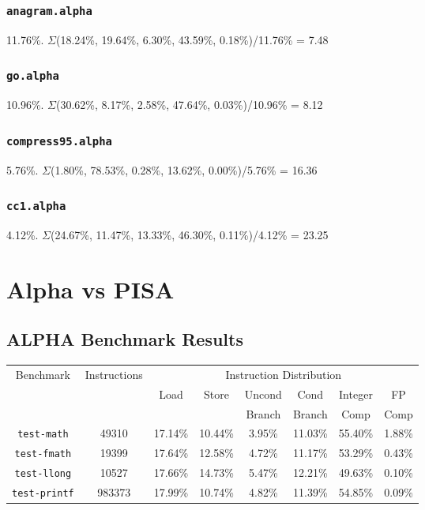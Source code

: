 \documentclass[11pt]{article}
\begin{document}
\subsubsection{\texttt{anagram.alpha}}
\label{sec:org025cec7}
11.76\%. \(\Sigma\)(18.24\%, 19.64\%, 6.30\%, 43.59\%, 0.18\%)/11.76\% = 7.48
\subsubsection{\texttt{go.alpha}}
\label{sec:org6ae7f30}
10.96\%. \(\Sigma\)(30.62\%, 8.17\%, 2.58\%, 47.64\%, 0.03\%)/10.96\% = 8.12
\subsubsection{\texttt{compress95.alpha}}
\label{sec:orga79c833}
5.76\%. \(\Sigma\)(1.80\%, 78.53\%, 0.28\%, 13.62\%, 0.00\%)/5.76\% = 16.36
\subsubsection{\texttt{cc1.alpha}}
\label{sec:orgd4887c7}
4.12\%. \(\Sigma\)(24.67\%, 11.47\%, 13.33\%, 46.30\%, 0.11\%)/4.12\% = 23.25

\section{Alpha vs PISA}
\label{sec:org52aff2c}
\subsection{ALPHA Benchmark Results}
\label{sec:orgb610585}
\begin{table}[htb]
\begin{center}
\begin{tabular}{|c|c|c|c|c|c|c|c|}
  \hline
  \multirow{3}{*}{Benchmark} & \multirow{3}{*}{Instructions} & \multicolumn{6}{c|}{Instruction Distribution} \\ \cline{3-8}
  & & \multirow{2}{*}{Load} & \multirow{2}{*}{Store} & Uncond & Cond   & Integer  & FP\\
  & &                       &                        & Branch & Branch & Comp     & Comp \\
  \hline
  \texttt{test-math} & 49310 & 17.14\% & 10.44\% & 3.95\% & 11.03\% & 55.40\% & 1.88\% \\
  \texttt{test-fmath} & 19399 & 17.64\% & 12.58\% & 4.72\% & 11.17\% & 53.29\% & 0.43\% \\
  \texttt{test-llong} & 10527 & 17.66\% & 14.73\% & 5.47\% & 12.21\% & 49.63\% & 0.10\% \\
  \texttt{test-printf} & 983373 & 17.99\% & 10.74\% & 4.82\% & 11.39\% & 54.85\% & 0.09\% \\
  \hline
\end{tabular}
\end{center}
\end{table}
\end{document}
